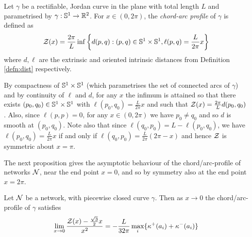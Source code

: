 \documentclass[12pt]{amsart}
\begin{document}
\begin{defn}
Let \(\gamma\) be a rectifiable, Jordan curve in the plane with total length \(L\) and parametrised by \(\gamma: \mathbb{S}^1 \to \mathbb{R}^2\). For \(x\in (0, 2\pi)\), the \emph{chord-arc profile} of \(\gamma\) is defined as
\[
\operatorname{\mathcal{Z}} (x) = \frac{2\pi}{L} \inf\left\{d(p, q): (p,q) \in \mathbb{S}^1\times\mathbb{S}^1, \ell(p,q) = \frac{L}{2\pi} x\right\}
\]
where \(d, \ell\) are the extrinsic and oriented intrinsic distances from Definition \ref{defn:dist} respectively.
\end{defn}

\begin{remark}
By compactness of \(\mathbb{S}^1\times \mathbb{S}^1\) (which parametrises the set of connected arcs of \(\gamma\)) and by continuity of \(\ell\) and \(d\), for any \(x\) the infimum is attained so that there exists \((p_0,q_0) \in \mathbb{S}^1 \times \mathbb{S}^1\) with \(\ell(p_0, q_0) = \frac{L}{2\pi}x\) and such that \(\operatorname{\mathcal{Z}}(x) = \frac{2\pi}{L} d(p_0, q_0)\). Also, since \(\ell(p,p) = 0\), for any \(x\in(0,2\pi)\) we have \(p_0 \ne q_0\) and so \(d\) is smooth at \((p_0, q_0)\). Note also that since \(\ell(q_0, p_0) = L - \ell(p_0, q_0)\), we have \(\ell(p_0, q_0) = \tfrac{L}{2\pi}x\) if and only if \(\ell(q_0, p_0) = \frac{L}{2\pi}(2\pi - x)\) and hence \(\operatorname{\mathcal{Z}}\) is symmetric about \(x = \pi\).
\end{remark}

The next proposition gives the asymptotic behaviour of the chord/arc-profile of networks \(\operatorname{\mathcal{N}}\), near the end point \(x=0\), and so by symmetry also at the end point \(x=2\pi\).

\begin{prop}
\label{prop:asymptotics}
Let \(\operatorname{\mathcal{N}}\) be a network, with piecewise closed curve \(\gamma\). Then as \(x\to 0\) the chord/arc-profile of \(\gamma\) satisfies
\[
\lim_{x\to 0} \frac{\operatorname{\mathcal{Z}}(x) - \tfrac{\sqrt{3}}{2}x}{x^2} = - \frac{L}{32\pi} \max_i \{\operatorname{\kappa}^+(a_i) + \operatorname{\kappa}^-(a_i)\}
\]
\end{prop}
\end{document}
